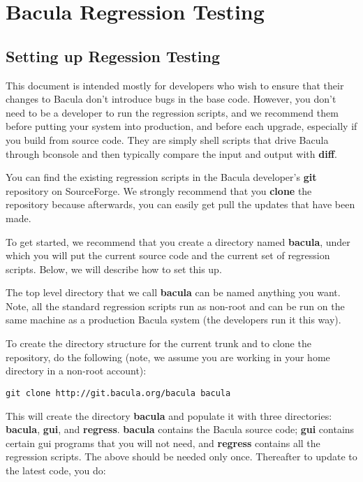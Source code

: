 
\chapter{Bacula Regression Testing}
\label{_ChapterStart8}

\section{Setting up Regession Testing}

This document is intended mostly for developers who wish to ensure that their
changes to Bacula don't introduce bugs in the base code.  However, you
don't need to be a developer to run the regression scripts, and we
recommend them before putting your system into production, and before each
upgrade, especially if you build from source code.  They are
simply shell scripts that drive Bacula through bconsole and then typically
compare the input and output with {\bf diff}.

You can find the existing regression scripts in the Bacula developer's
{\bf git} repository on SourceForge.  We strongly recommend that you {\bf
clone} the repository because afterwards, you can easily get pull the
updates that have been made.

To get started, we recommend that you create a directory named {\bf
bacula}, under which you will put the current source code and the current
set of regression scripts.  Below, we will describe how to set this up.

The top level directory that we call {\bf bacula} can be named anything you
want.  Note, all the standard regression scripts run as non-root and can be
run on the same machine as a production Bacula system (the developers run
it this way).

To create the directory structure for the current trunk and to
clone the repository, do the following (note, we assume you
are working in your home directory in a non-root account):

\footnotesize
\begin{verbatim}
git clone http://git.bacula.org/bacula bacula
\end{verbatim}
\normalsize

This will create the directory {\bf bacula} and populate it with
three directories: {\bf bacula}, {\bf gui}, and {\bf regress}.
{\bf bacula} contains the Bacula source code; {\bf gui} contains
certain gui programs that you will not need, and {\bf regress} contains
all the regression scripts.  The above should be needed only
once. Thereafter to update to the latest code, you do:

